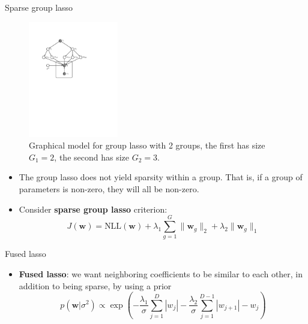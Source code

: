 \documentclass[10pt,mathserif]{beamer}
\begin{document}
\begin{frame}{Sparse group lasso}
\begin{figure}[h]
\centering
\includegraphics[width=0.35\textwidth]{groupLassoBayesNoSigma}
\caption{Graphical model for group lasso with 2 groups, the first has size $G_1 = 2$, the second has size $G_2 = 3$.}
\end{figure} 
\begin{itemize}
    \item The group lasso does not yield sparsity within a group. That is, if a group of parameters is non-zero, they will all be non-zero.
    \item Consider \textbf{sparse group lasso} criterion:
    \begin{equation*}
        J(\bm{w}) = \text{NLL}(\bm{w}) + \lambda_1 \sum_{g=1}^G \|\bm{w}_g\|_2 + \lambda_2 \|\bm{w}_g\|_1
    \end{equation*}
\end{itemize}
\end{frame}

\begin{frame}{Fused lasso}
\begin{itemize}
    \item \textbf{Fused lasso}: we want neighboring coefficients to be similar to each other, in addition to being sparse, by using a prior
    \begin{equation*}
      p(\bm{w}|\sigma^2) \propto \exp(-\frac{\lambda_1}{\sigma}\sum_{j=1}^D|w_j| -\frac{\lambda_2}{\sigma}\sum_{j=1}^{D-1}|w_{j+1}|-w_j)
    \end{equation*}
\end{itemize}
\end{frame}
\end{document}
